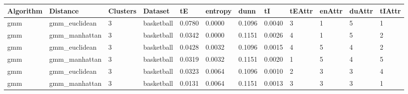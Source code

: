 \begin{itemize}
{\small
\begin{longtable}{| p{1cm} | p{1.8cm} | p{0.7cm} | p{0.9cm} | p{0.5cm} | p{0.65cm} | p{0.5cm} | p{0.5cm} | p{0.55cm} | p{0.55cm} | p{0.6cm} | p{0.5cm} |}
\hline
\scriptsize  Algorithm & \scriptsize  Distance  &  \scriptsize Clusters & \scriptsize  Dataset & \scriptsize tE & \scriptsize entropy & \scriptsize  dunn  & \scriptsize tI & \scriptsize tEAttr & \scriptsize enAttr & \scriptsize duAttr & \scriptsize tIAttr  \\
\hline
\scriptsize      gmm     & \scriptsize  gmm\_euclidean & \scriptsize    3     & \scriptsize basketball & \scriptsize    0.0780    & \scriptsize 0.0000  & \scriptsize 0.1096 & \scriptsize    0.0040    & \scriptsize        3         & \scriptsize     1       & \scriptsize      5    & \scriptsize        1 \\
\cline{2-12}
\scriptsize      gmm     & \scriptsize  gmm\_manhattan & \scriptsize    3     & \scriptsize basketball & \scriptsize    0.0342    & \scriptsize 0.0000  & \scriptsize 0.1151 & \scriptsize    0.0026    & \scriptsize        4         & \scriptsize     1       & \scriptsize      5    & \scriptsize        2 \\
\cline{2-12}
\scriptsize      gmm     & \scriptsize  gmm\_euclidean & \scriptsize    3     & \scriptsize basketball & \scriptsize    0.0428    & \scriptsize 0.0032  & \scriptsize 0.1096 & \scriptsize    0.0015    & \scriptsize        4         & \scriptsize     5       & \scriptsize      4    & \scriptsize        2 \\
\cline{2-12}
\scriptsize      gmm     & \scriptsize  gmm\_manhattan & \scriptsize    3     & \scriptsize basketball & \scriptsize    0.0319    & \scriptsize 0.0032  & \scriptsize 0.1151 & \scriptsize    0.0020    & \scriptsize        1         & \scriptsize     5       & \scriptsize      4    & \scriptsize        5 \\
\cline{2-12}
\scriptsize      gmm     & \scriptsize  gmm\_euclidean & \scriptsize    3     & \scriptsize basketball & \scriptsize    0.0323    & \scriptsize 0.0064  & \scriptsize 0.1096 & \scriptsize    0.0010    & \scriptsize        2         & \scriptsize     3       & \scriptsize      3    & \scriptsize        4 \\
\cline{2-12}
\scriptsize      gmm     & \scriptsize  gmm\_manhattan & \scriptsize    3     & \scriptsize basketball & \scriptsize    0.0131    & \scriptsize 0.0064  & \scriptsize 0.1151 & \scriptsize    0.0013    & \scriptsize        3         & \scriptsize     3       & \scriptsize      3    & \scriptsize        1 \\

\end{longtable}}
\end{itemize}
